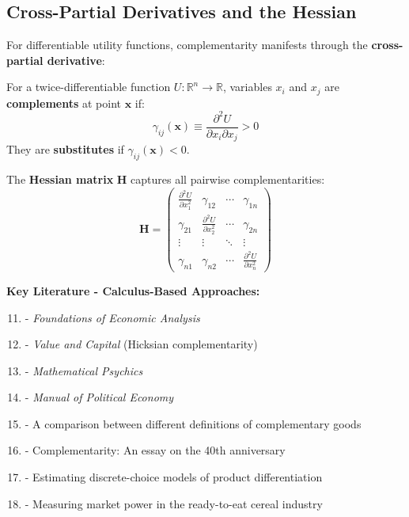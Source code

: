 \subsection{Cross-Partial Derivatives and the Hessian}
\label{subsec:cross-partial}

For differentiable utility functions, complementarity manifests through the \textbf{cross-partial derivative}:

\begin{definition}
For a twice-differentiable function $U: \mathbb{R}^n \to \mathbb{R}$, variables $x_i$ and $x_j$ are \textbf{complements} at point $\mathbf{x}$ if:
\begin{equation}
\gamma_{ij}(\mathbf{x}) \equiv \frac{\partial^2 U}{\partial x_i \partial x_j} > 0
\label{eq:local-complementarity}
\end{equation}
They are \textbf{substitutes} if $\gamma_{ij}(\mathbf{x}) < 0$.
\end{definition}

The \textbf{Hessian matrix} $\mathbf{H}$ captures all pairwise complementarities:
\begin{equation}
\mathbf{H} = \begin{pmatrix}
\frac{\partial^2 U}{\partial x_1^2} & \gamma_{12} & \cdots & \gamma_{1n} \\
\gamma_{21} & \frac{\partial^2 U}{\partial x_2^2} & \cdots & \gamma_{2n} \\
\vdots & \vdots & \ddots & \vdots \\
\gamma_{n1} & \gamma_{n2} & \cdots & \frac{\partial^2 U}{\partial x_n^2}
\end{pmatrix}
\label{eq:hessian}
\end{equation}

\textbf{Key Literature - Calculus-Based Approaches:}
\begin{enumerate}[noitemsep]
    \setcounter{enumi}{10}
    \item \citet{samuelson1947} - \textit{Foundations of Economic Analysis}
    \item \citet{hicks1939} - \textit{Value and Capital} (Hicksian complementarity)
    \item \citet{edgeworth1881} - \textit{Mathematical Psychics}
    \item \citet{pareto1906} - \textit{Manual of Political Economy}
    \item \citet{allen1934} - A comparison between different definitions of complementary goods
    \item \citet{samuelson1974} - Complementarity: An essay on the 40th anniversary
    \item \citet{berry1994} - Estimating discrete-choice models of product differentiation
    \item \citet{nevo2001} - Measuring market power in the ready-to-eat cereal industry
\end{enumerate}

